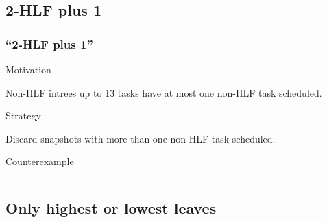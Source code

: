 \documentclass{beamer}
\newenvironment{strategyblock}
{
  \begin{block}{Strategy}
}
{
  \end{block}
}
\newenvironment{motivationblock}
{
  \begin{block}{Motivation}
}
{
  \end{block}
}
\newenvironment{counterexampleblock}
{
  \begin{alertblock}{Counterexample}
}
{
  \end{alertblock}
}
\begin{document}


\subsection{2-HLF plus 1}

\begin{frame}
  \frametitle{``2-HLF plus 1''}
  \begin{motivationblock}
    Non-HLF intrees up to 13 tasks have at most one non-HLF task scheduled.
  \end{motivationblock}
  \begin{strategyblock}
    Discard snapshots with more than one non-HLF task scheduled.
  \end{strategyblock}
  \begin{counterexampleblock}
    \begin{columns}
      \begin{column}{.5\textwidth}
        
      \end{column}
      \begin{column}{.5\textwidth}
              
      \end{column}
    \end{columns}
  \end{counterexampleblock}
\end{frame}

\subsection{Only highest or lowest leaves}
\end{document}
